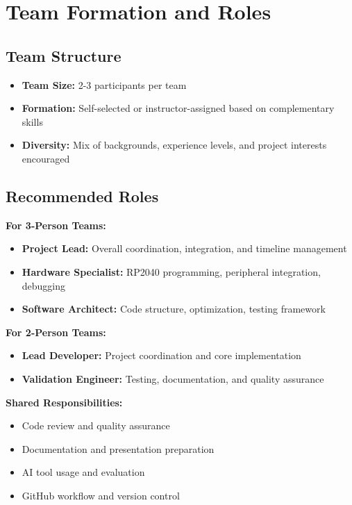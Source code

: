 \documentclass[11pt,a4paper]{article}
\begin{document}
\section{Team Formation and Roles}

\subsection{Team Structure}
\begin{itemize}
    \item \textbf{Team Size:} 2-3 participants per team
    \item \textbf{Formation:} Self-selected or instructor-assigned based on complementary skills
    \item \textbf{Diversity:} Mix of backgrounds, experience levels, and project interests encouraged
\end{itemize}

\subsection{Recommended Roles}
\textbf{For 3-Person Teams:}
\begin{itemize}
    \item \textbf{Project Lead:} Overall coordination, integration, and timeline management
    \item \textbf{Hardware Specialist:} RP2040 programming, peripheral integration, debugging
    \item \textbf{Software Architect:} Code structure, optimization, testing framework
\end{itemize}

\textbf{For 2-Person Teams:}
\begin{itemize}
    \item \textbf{Lead Developer:} Project coordination and core implementation
    \item \textbf{Validation Engineer:} Testing, documentation, and quality assurance
\end{itemize}

\textbf{Shared Responsibilities:}
\begin{itemize}
    \item Code review and quality assurance
    \item Documentation and presentation preparation
    \item AI tool usage and evaluation
    \item GitHub workflow and version control
\end{itemize}
\end{document}
